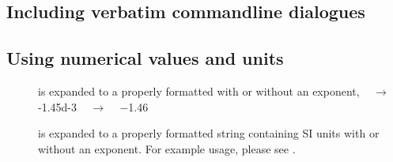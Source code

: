 \subsection[Verbatim commandline dialogues]{Including verbatim commandline dialogues}

\todo

\subsection[Numerical values and units]{Using numerical values and units}

\todo %

\begin{description}
\item[] \enforcenewline%
  \latexcmd{\num} is expanded to a properly formatted  with or without an exponent, \EG{} \newline
    ~ $\rightarrow$ ~  \num{-1.45d-3} \newline
       ~ $\rightarrow$ ~  \num{-1.46}

\item[]
  \enforcenewline%
  \latexcmd{\SI} is expanded to a properly formatted string containing SI
  units with or without an exponent.  For example usage, please see
  \p.

\item[]
\end{description}

\todo


